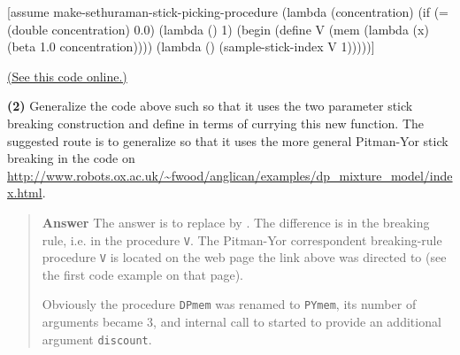 \documentclass[11pt,reqno]{amsart}
\newif\ifanswers
\newcommand{\+}[1]{\ensuremath{{\mathbf{#1}}}}
\begin{document}
\begin{code}{}{} 
[assume make-sethuraman-stick-picking-procedure (lambda (concentration)
  (if (= (double concentration) 0.0)
    (lambda () 1)
    (begin (define V (mem (lambda (x) (beta 1.0 concentration))))
      (lambda () (sample-stick-index V 1)))))] 
\end{code}
\href{http://www.robots.ox.ac.uk/~fwood/anglican/teaching/mlss2014/py_mem/code/1_2.anglican}{(See this code online.)}

\fi


\vspace{1cm}
{\bf (2)} Generalize the code above such so that  it uses the two parameter stick breaking construction and define  in terms of currying this new function.  The suggested route is to generalize  so that it uses the more general Pitman-Yor stick breaking in the code on
\url{http://www.robots.ox.ac.uk/~fwood/anglican/examples/dp_mixture_model/index.html}.




\ifanswers
\begin{quotation}
 {\bf Answer } 
 The answer is to replace 
 by . The difference is
 in the breaking rule, i.e. in the procedure {\tt V}. The Pitman-Yor correspondent
 breaking-rule procedure {\tt V} is located on the web page the link above was directed to
 (see the first code example on that page).
 
 Obviously the procedure {\tt DPmem} was renamed to {\tt PYmem}, its number of arguments
 became 3, and internal call to  started to
 provide an additional argument {\tt discount}.
\end{quotation}
 
\end{document}
